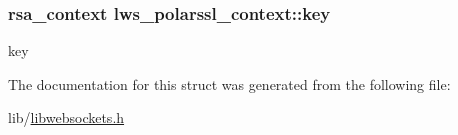 \subsubsection[{\texorpdfstring{key}{key}}]{\setlength{\rightskip}{0pt plus 5cm}rsa\+\_\+context lws\+\_\+polarssl\+\_\+context\+::key}\hypertarget{structlws__polarssl__context_a919c33af37aab170f828d954de1fa270}{}\label{structlws__polarssl__context_a919c33af37aab170f828d954de1fa270}
key 

The documentation for this struct was generated from the following file\+:\begin{DoxyCompactItemize}
\item 
lib/\hyperlink{libwebsockets_8h}{libwebsockets.\+h}\end{DoxyCompactItemize}
